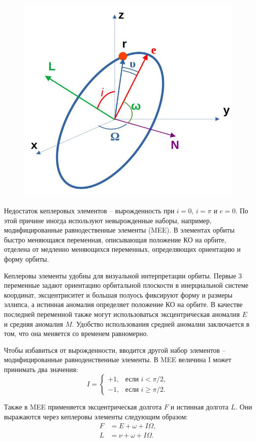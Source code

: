 \begin{figure}[h!]
    \centering
    \includegraphics[width=0.6\linewidth]{../images/review/kepler.jpg}
    \label{fig:kepler}
\end{figure}

Недостаток кеплеровых элементов -- вырожденность при $i = 0$, $i = \pi$ и $e = 0$.
По этой причине иногда используют невырожденные наборы, например, 
модифицированные равнодественные элементы (MEE).
В элементах орбиты быстро меняющаяся переменная, описывающая положение КО на орбите, отделена от медленно меняющихся переменных,
определяющих ориентацию и форму орбиты.

Кеплеровы элементы удобны для визуальной интерпретации орбиты.
Первые 3 переменные задают ориентацию орбитальной плоскости в инерциальной системе координат,
эксцентриситет и большая полуось фиксируют форму и размеры эллипса, а истинная аномалия определяет положение КО на орбите.
В качестве последней переменной также могут использоваться эксцентрическая аномалия $E$ и средняя аномалия $M$.
Удобство использования средней аномалии заключается в том, что она меняется со временем равномерно.

Чтобы избавиться от вырожденности, вводится другой набор элементов -- модифицированные равноденственные элементы.
В MEE величина I может принимать два значения:
\[
I = \left\{
\begin{array}{ll}
+1, & \text{если } i < \pi / 2, \\
-1, & \text{если } i \ge \pi / 2.
\end{array}
\right.
\]

Также в MEE применяется эксцентрическая долгота $F$ и истинная долгота $L$. 
Они выражаются через кеплеровы элементы следующим образом:
\begin{align*}
    F &= E + \omega + I \Omega, \\
    L &= \nu + \omega + I \Omega.
\end{align*}

